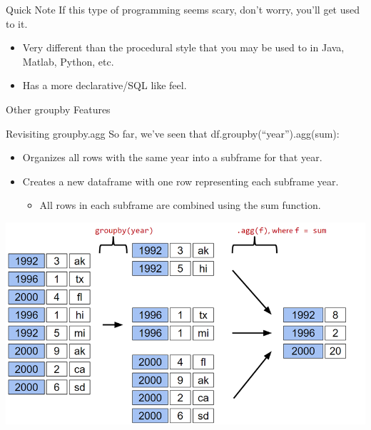 \documentclass[aspectratio=169]{../latex_main/tntbeamer}  %
\begin{document}
    
    
    \begin{frame}{Quick Note}
        If this type of programming seems scary, don’t worry, you’ll get used to it.
        \begin{itemize}
            \item Very different than the procedural style that you may be used to in Java, Matlab, Python, etc.
            \item Has a more declarative/SQL like feel.
        \end{itemize}
    \end{frame}
    
    
    \begin{frame}{Other groupby Features}
        
    \end{frame}
    
    
    
    \begin{frame}{Revisiting groupby.agg}
        So far, we’ve seen that df.groupby(“year”).agg(sum):
        \begin{itemize}
            \item Organizes all rows with the same year into a subframe for that year. 
            \item Creates a new dataframe with one row representing each subframe year.
            \begin{itemize}
                \item All rows in each subframe are combined using the sum function.
            \end{itemize}
        \end{itemize}
        \centering
        \includegraphics[scale=.38]{Bild32}
    \end{frame}
    
\end{document}

